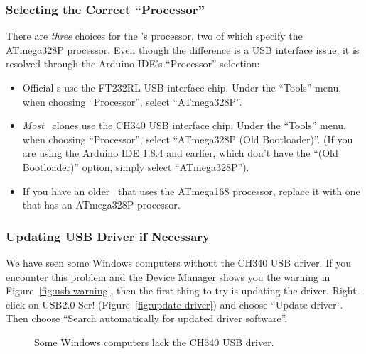 \subsubsection{Selecting the Correct ``Processor''}\label{subsubsec:processor-selection}

There are \textit{three} choices for the \developmentboard{}'s processor, two of which specify the ATmega328P processor.
Even though the difference is a USB interface issue, it is resolved through the Arduino IDE's ``Processor'' selection:

\begin{itemize}
    \item Official \developmentboard{}s use the FT232RL USB interface chip.
    Under the ``Tools'' menu, when choosing ``Processor'', select ``ATmega328P''.
    \item \textit{Most} \developmentboard\ clones use the CH340 USB interface chip.
    Under the ``Tools'' menu, when choosing ``Processor'', select ``ATmega328P (Old Bootloader)''.
    (If you are using the Arduino IDE 1.8.4 and earlier, which don't have the ``(Old Bootloader)'' option, simply select ``ATmega328P'').
    \item If you have an older \developmentboard\ that uses the ATmega168 processor, replace it with one that has an ATmega328P processor.
\end{itemize}

\subsubsection{Updating USB Driver if Necessary}

We have seen some Windows computers without the CH340 USB driver.
If you encounter this problem and the Device Manager shows you the warning in Figure~\ref{fig:usb-warning}, then the first thing to try is updating the driver.
Right-click on USB2.0-Ser! (Figure~\ref{fig:update-driver}) and choose ``Update driver''.
Then choose ``Search automatically for updated driver software''.

\begin{figure}
    \centering
    \hfil
    \caption{Some Windows computers lack the CH340 USB driver.}
\end{figure}

